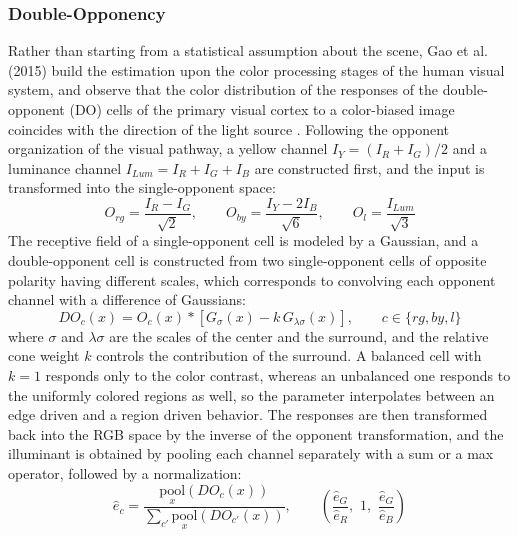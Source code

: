 \subsubsection{Double-Opponency}
\label{algorithm:double_opponency}
Rather than starting from a statistical assumption about the scene, Gao et al. (2015) build the estimation upon the color processing stages of the human visual system, and observe that the color distribution of the responses of the double-opponent (DO) cells of the primary visual cortex to a color-biased image coincides with the direction of the light source \cite{gaoDoubleOpponency}. Following the opponent organization of the visual pathway, a yellow channel $I_Y = (I_R + I_G)/2$ and a luminance channel $I_{Lum} = I_R + I_G + I_B$ are constructed first, and the input is transformed into the single-opponent space:
\begin{equation}
O_{rg} = \frac{I_R - I_G}{\sqrt{2}}, \qquad
O_{by} = \frac{I_Y - 2 I_B}{\sqrt{6}}, \qquad
O_{l} = \frac{I_{Lum}}{\sqrt{3}}
\end{equation}
The receptive field of a single-opponent cell is modeled by a Gaussian, and a double-opponent cell is constructed from two single-opponent cells of opposite polarity having different scales, which corresponds to convolving each opponent channel with a difference of Gaussians:
\begin{equation}
DO_c(x) = O_c(x) \ast \left[ G_{\sigma}(x) - k \, G_{\lambda\sigma}(x) \right], \qquad c \in \{rg, by, l\}
\end{equation}
where $\sigma$ and $\lambda\sigma$ are the scales of the center and the surround, and the relative cone weight $k$ controls the contribution of the surround. A balanced cell with $k=1$ responds only to the color contrast, whereas an unbalanced one responds to the uniformly colored regions as well, so the parameter interpolates between an edge driven and a region driven behavior. The responses are then transformed back into the RGB space by the inverse of the opponent transformation, and the illuminant is obtained by pooling each channel separately with a sum or a max operator, followed by a normalization:
\begin{equation}
\hat{e}_c = \frac{\underset{x}{\text{pool}} \left( DO_c(x) \right)}{\sum_{c'} \underset{x}{\text{pool}} \left( DO_{c'}(x) \right)}, \qquad
\left( \frac{\hat{e}_G}{\hat{e}_R}, \,\, 1, \,\, \frac{\hat{e}_G}{\hat{e}_B} \right)
\end{equation}
